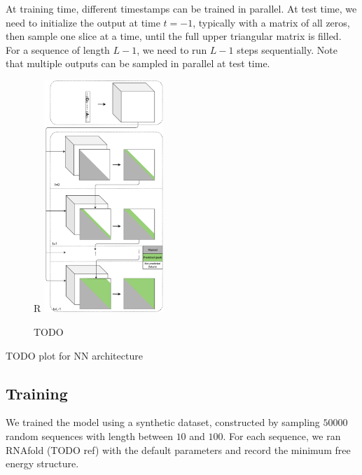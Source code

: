 \documentclass{article}
\begin{document}
At training time, different timestamps can be trained in parallel.
At test time, we need to initialize the output at time $t=-1$, typically with a matrix of all zeros,
then sample one slice at a time, until the full upper triangular matrix is filled.
For a sequence of length $L-1$, we need to run $L-1$ steps sequentially.
Note that multiple outputs can be sampled in parallel at test time.


%

\begin{figure}{R}
        \centering
        \includegraphics[width=0.4\textwidth]{plot/nn_arch_2.pdf}
        \caption{TODO}
        \label{fig:nn_arch_2}
        \centering
\end{figure}


TODO plot for NN architecture


\subsection{Training}

We trained the model using a synthetic dataset, constructed by sampling $50000$ random sequences with length
between $10$ and $100$.
For each sequence, we ran RNAfold (TODO ref) with the default parameters and
record the minimum free energy structure.
\end{document}
